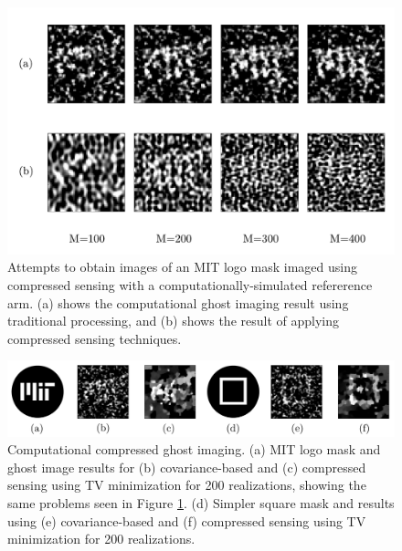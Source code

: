 \begin{figure}[t]
\begin{center}
\includegraphics[width=15cm]{figure-ghost-compressed-czl1.pdf}
\caption{Attempts to obtain images of an MIT logo mask imaged using compressed sensing with a computationally-simulated refererence arm. (a) shows the computational ghost imaging result using traditional processing, and (b) shows the result of applying compressed sensing techniques.}
\label{figure:ghost-compressed-czl1}
\end{center}
\end{figure}

\begin{figure}[t]
\begin{center}
\includegraphics[width=15cm]{figure-ghost-ccgi.pdf}
\caption{Computational compressed ghost imaging. (a) MIT logo mask and ghost image results for (b) covariance-based and (c) compressed sensing using TV minimization for 200 realizations, showing the same problems seen in Figure \ref{figure:ghost-compressed-czl1}. (d) Simpler square mask and results using (e) covariance-based and (f) compressed sensing using TV minimization for 200 realizations.}
\label{figure:ghost-ccgi}
\end{center}
\end{figure}

